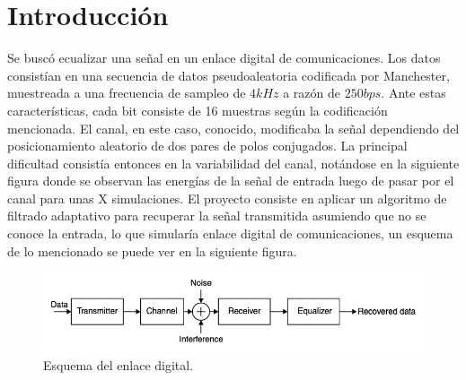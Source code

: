 \documentclass[main.tex]{subfiles}
\begin{document}
\begin{abstract}
\end{abstract}


\section{Introducción}
Se buscó ecualizar una señal en un enlace digital de comunicaciones. 
Los datos consistían en una secuencia de datos pseudoaleatoria 
codificada por Manchester, muestreada a una frecuencia de sampleo
 de $4kHz$ a razón de $250bps$. Ante estas características, cada bit consiste de 
 16 muestras según la codificación mencionada. El canal, en este caso, conocido, 
 modificaba la señal dependiendo del posicionamiento
 aleatorio de dos pares de polos conjugados.
La principal dificultad consistía entonces en la variabilidad del canal, 
notándose en la siguiente figura donde se observan las energías 
de la señal de entrada luego de pasar por el canal para unas 
X simulaciones.\newline
El proyecto consiste en aplicar un algoritmo de filtrado adaptativo
 para recuperar la señal transmitida asumiendo que no se conoce la entrada, 
 lo que simularía enlace digital de comunicaciones, un esquema de lo mencionado
se puede ver en la siguiente figura.

\begin{figure}[h]
    \centering
    \includegraphics[scale=0.5]{imagenes/preblock.png}
    \caption{Esquema del enlace digital.}
\end{figure}

\end{document}
